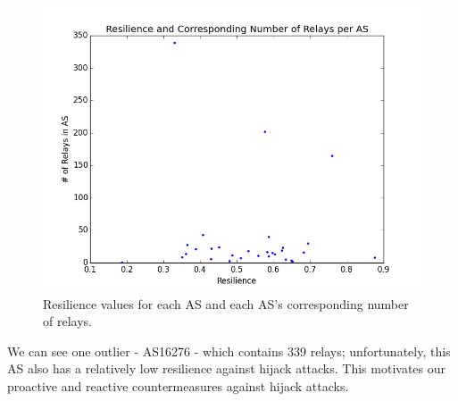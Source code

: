 \begin{figure}
\centering
\includegraphics[width=.5\textwidth]{res_num_relays}
\caption{Resilience values for each AS and each AS's corresponding number of relays.}
\label{fig:res_relays}
\end{figure}

We can see one outlier - AS16276 - which contains 339 relays; unfortunately, this AS also has a relatively low resilience against hijack attacks.  This motivates our proactive and reactive countermeasures against hijack attacks.
